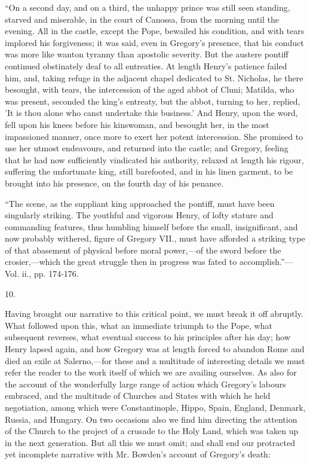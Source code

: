 ``On
a second day, and on a third, the unhappy prince was still seen
standing, starved and miserable, in the court of Canossa, from the
morning until the evening. All in the castle, except the Pope,
bewailed his condition, and with tears implored his forgiveness; it
was said, even in Gregory's presence, that his conduct was more like
wanton tyranny than apostolic severity. But the austere pontiff
continued obstinately deaf to all entreaties. At length Henry's
patience failed him, and, taking refuge in the adjacent chapel
dedicated to St. Nicholas, he there besought, with tears, the
intercession of the aged abbot of Cluni; Matilda, who was present,
seconded the king's entreaty, but the abbot, turning to her, replied,
'It is thou alone who canst undertake this business.' And Henry, upon
the word, fell upon his knees before his kinswoman, and besought her,
in the most impassioned manner, once more to exert her potent
intercession. She promised to use her utmost endeavours, and returned
into the castle; and Gregory, feeling that he had now sufficiently
vindicated his authority, relaxed at length his rigour, suffering the
unfortunate king, still
barefooted, and in his linen garment, to be brought into his presence,
on the fourth day of his penance.

``The
scene, as the suppliant king approached the pontiff, must have been
singularly striking. The youthful and vigorous Henry, of lofty stature
and commanding features, thus humbling himself before the small,
insignificant, and now probably withered, figure of Gregory VII., must
have afforded a striking type of that abasement of physical before
moral power,—of the sword before the crosier,—which the great
struggle then in progress was fated to accomplish.''—Vol. ii., pp.
174-176.

10.

Having brought our narrative to this critical
point, we must break it off abruptly. What followed upon this, what an
immediate triumph to the Pope, what subsequent reverses, what eventual
success to his principles after his day; how Henry lapsed again, and
how Gregory was at length forced to abandon Rome and died an exile at
Salerno,—for these and a multitude of interesting details we must
refer the reader to the work itself of which we are availing
ourselves. As also for the account of the wonderfully large range of
action which Gregory's labours embraced, and the multitude of Churches
and States with which he held negotiation, among which were
Constantinople, Hippo, Spain, England, Denmark, Russia, and Hungary.
On two occasions also we find him directing the attention of the
Church to the project of a crusade to the Holy Land, which was taken
up in the next generation. But all this we must omit; and shall end
our protracted yet incomplete narrative with Mr. Bowden's account of
Gregory's death:

